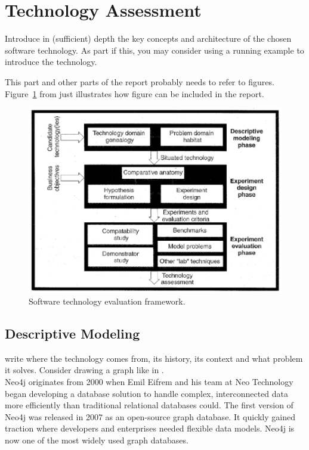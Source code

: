 \section{Technology Assessment}
\label{sec:technology}


Introduce in (sufficient) depth the key concepts and architecture of the chosen software technology. As part if this, you may consider using a running example to introduce the technology.

This part and other parts of the report probably needs to refer to
figures. Figure~\ref{fig:framework} from \cite{brown:96} just
illustrates how figure can be included in the report.

\begin{figure}[thb]
	\centering
	\includegraphics[scale=0.5]{figs/framework.png}
	\caption{Software technology evaluation framework.}
	\label{fig:framework}
\end{figure}

\subsection{Descriptive Modeling}

write where the technology comes from, its history, its context and what problem it solves.
Consider drawing a graph like in \cite{brown:96}.
\\
Neo4j originates from 2000 when Emil Eifrem and his team at Neo Technology began developing a database solution to handle complex, interconnected data more efficiently than traditional relational databases could. The first version of Neo4j was released in 2007 as an open-source graph database. It quickly gained traction where developers and enterprises needed flexible data models. Neo4j is now one of the most widely used graph databases.

